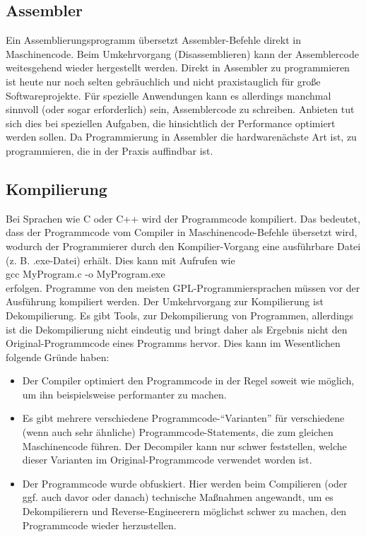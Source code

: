 \begin{multicols}{3}
\subsection{Assembler}
Ein Assemblierungsprogramm übersetzt Assembler-Befehle direkt in Maschinencode. Beim Umkehrvorgang (Disassemblieren) kann der Assemblercode weitesgehend wieder hergestellt werden. Direkt in Assembler zu programmieren ist heute nur noch selten gebräuchlich und nicht praxistauglich für große Softwareprojekte. Für spezielle Anwendungen kann es allerdings manchmal sinnvoll (oder sogar erforderlich) sein, Assemblercode zu schreiben. Anbieten tut sich dies bei speziellen Aufgaben, die hinsichtlich der Performance optimiert werden sollen. Da Programmierung in Assembler die hardwarenächste Art ist, zu programmieren, die in der Praxis auffindbar ist. 
\subsection{Kompilierung}
Bei Sprachen wie C oder C++ wird der Programmcode kompiliert. Das bedeutet, dass der Programmcode vom Compiler in Maschinencode-Befehle übersetzt wird, wodurch der Programmierer durch den Kompilier-Vorgang eine ausführbare Datei (z. B. .exe-Datei) erhält. Dies kann mit Aufrufen wie\\
gcc MyProgram.c -o MyProgram.exe\\

erfolgen. Programme von den meisten GPL-Programmiersprachen müssen vor der Ausführung kompiliert werden. Der Umkehrvorgang zur Kompilierung ist Dekompilierung. Es gibt Tools, zur Dekompilierung von Programmen, allerdings ist die Dekompilierung nicht eindeutig und bringt daher als Ergebnis nicht den Original-Programmcode eines Programms hervor. Dies kann im Wesentlichen folgende Gründe haben:\\
\begin{itemize}
\item Der Compiler optimiert den Programmcode in der Regel soweit wie möglich, um ihn beispielsweise performanter zu machen.
\item Es gibt mehrere verschiedene Programmcode-\enquote{Varianten} für verschiedene (wenn auch sehr ähnliche) Programmcode-Statements, die zum gleichen Maschinencode führen. Der Decompiler kann nur schwer feststellen, welche dieser Varianten im Original-Programmcode verwendet worden ist.
\item Der Programmcode wurde obfuskiert. Hier werden beim Compilieren (oder ggf. auch davor oder danach) technische Maßnahmen angewandt, um es Dekompilierern und Reverse-Engineerern möglichst schwer zu machen, den Programmcode wieder herzustellen.
\end{itemize}

\end{multicols}
